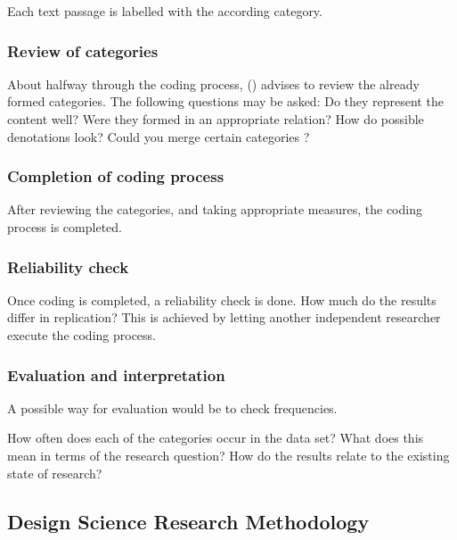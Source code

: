 Each text passage is labelled with the according category.

\subsubsection*{Review of categories}

About halfway through the coding process,
\citeauthor{mayring2019qualitative} (\citeyear{mayring2019qualitative})
advises to review the already formed categories.
The following questions may be asked:
Do they represent the content well?
Were they formed in an appropriate relation?
How do possible denotations look?
Could you merge certain categories
\autocite{mayring2019qualitative}?

\subsubsection*{Completion of coding process}

After reviewing the categories,
and taking appropriate measures,
the coding process is completed.

\subsubsection*{Reliability check}

Once coding is completed,
a reliability check is done.
How much do the results differ in replication?
This is achieved by letting another independent researcher
execute the coding process.


\subsubsection*{Evaluation and interpretation}

A possible way for evaluation would be to check frequencies.

How often does each of the categories occur in the data set?
What does this mean in terms of the research question?
How do the results relate to the existing state of research?













\subsection{Design Science Research Methodology}

